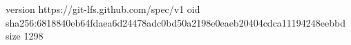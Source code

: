 version https://git-lfs.github.com/spec/v1
oid sha256:6818840eb64fdaea6d24478adc0bd50a2198e0eaeb20404cdca11194248eebbd
size 1298
